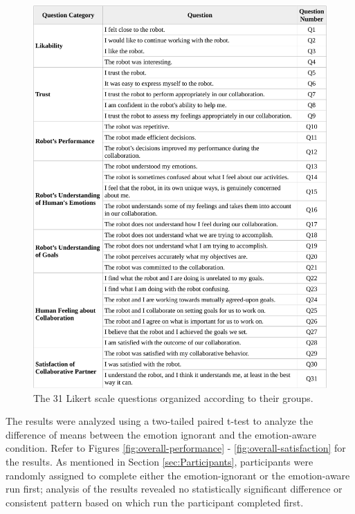 \documentclass[12pt]{report}
\begin{document}
\begin{figure}
 \centering
 \includegraphics[width=1\textwidth]{figure/table1-croped.pdf}
 \caption{The 31 Likert scale questions organized according to their groups.}
 \label{fig:31questions-table}
\end{figure}
\clearpage

The results were analyzed using a two-tailed paired t-test to analyze the
difference of means between the emotion ignorant and the emotion-aware
condition. Refer to Figures \ref{fig:overall-performance} -
\ref{fig:overall-satisfaction} for the results. As mentioned in Section
\ref{sec:Participants}, participants were randomly assigned to complete either
the emotion-ignorant or the emotion-aware run first; analysis of the results
revealed no statistically significant difference or consistent pattern based on
which run the participant completed first. \\
\end{document}
